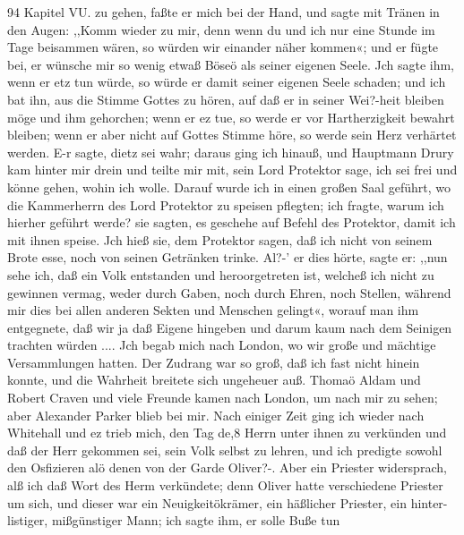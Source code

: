94 Kapitel VU.
zu gehen, faßte er mich bei der Hand, und sagte mit Tränen in
den Augen: ,,Komm wieder zu mir, denn wenn du und ich nur
eine Stunde im Tage beisammen wären, so würden wir einander
näher kommen«; und er fügte bei, er wünsche mir so wenig etwaß
Böseö als seiner eigenen Seele. Jch sagte ihm, wenn er etz tun
würde, so würde er damit seiner eigenen Seele schaden; und ich
bat ihn, aus die Stimme Gottes zu hören, auf daß er in seiner
Wei?-heit bleiben möge und ihm gehorchen; wenn er ez tue, so
werde er vor Hartherzigkeit bewahrt bleiben; wenn er aber
nicht auf Gottes Stimme höre, so werde sein Herz verhärtet
werden. E-r sagte, dietz sei wahr; daraus ging ich hinauß, und
Hauptmann Drury kam hinter mir drein und teilte mir mit, sein
Lord Protektor sage, ich sei frei und könne gehen, wohin ich
wolle. Darauf wurde ich in einen großen Saal geführt, wo
die Kammerherrn des Lord Protektor zu speisen pflegten; ich fragte,
warum ich hierher geführt werde? sie sagten, es geschehe auf
Befehl des Protektor, damit ich mit ihnen speise. Jch hieß sie,
dem Protektor sagen, daß ich nicht von seinem Brote esse, noch
von seinen Getränken trinke. Al?-’ er dies hörte, sagte er: ,,nun
sehe ich, daß ein Volk entstanden und heroorgetreten ist, welcheß
ich nicht zu gewinnen vermag, weder durch Gaben, noch durch
Ehren, noch Stellen, während mir dies bei allen anderen Sekten
und Menschen gelingt«, worauf man ihm entgegnete, daß wir
ja daß Eigene hingeben und darum kaum nach dem Seinigen
trachten würden ....
Jch begab mich nach London, wo wir große und mächtige
Versammlungen hatten. Der Zudrang war so groß, daß ich fast
nicht hinein konnte, und die Wahrheit breitete sich ungeheuer auß.
Thomaö Aldam und Robert Craven und viele Freunde kamen
nach London, um nach mir zu sehen; aber Alexander Parker
blieb bei mir.
Nach einiger Zeit ging ich wieder nach Whitehall und ez
trieb mich, den Tag de,8 Herrn unter ihnen zu verkünden und
daß der Herr gekommen sei, sein Volk selbst zu lehren, und ich
predigte sowohl den Osfizieren alö denen von der Garde Oliver?-.
Aber ein Priester widersprach, alß ich daß Wort des Herm
verkündete; denn Oliver hatte verschiedene Priester um sich, und
dieser war ein Neuigkeitökrämer, ein häßlicher Priester, ein hinter-
listiger, mißgünstiger Mann; ich sagte ihm, er solle Buße tun


